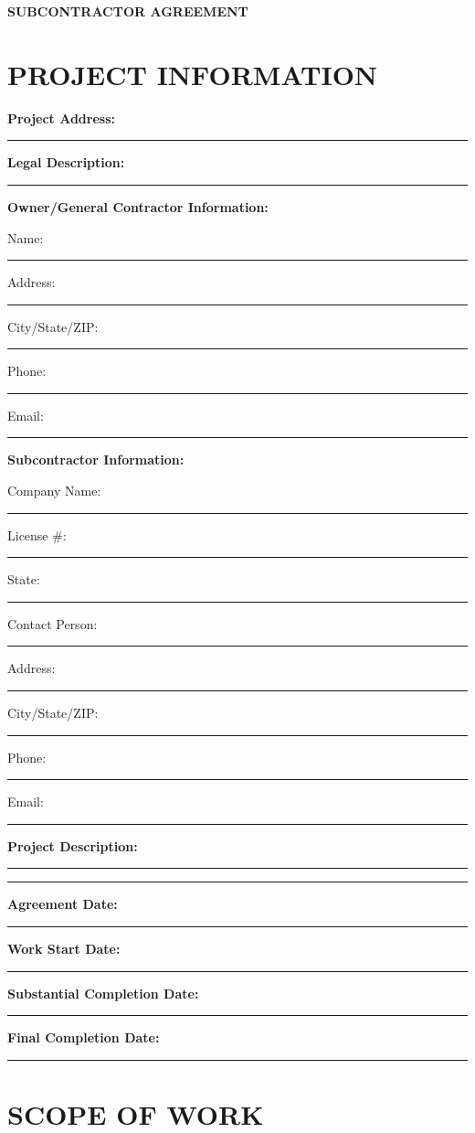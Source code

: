 \documentclass[11pt,letterpaper]{article}
\begin{document}
\begin{center}
\textbf{\Large SUBCONTRACTOR AGREEMENT}
\end{center}

\vspace{12pt}

\section*{PROJECT INFORMATION}

\textbf{Project Address:} \rule{10cm}{0.4pt}

\textbf{Legal Description:} \rule{9.5cm}{0.4pt}

\vspace{6pt}

\textbf{Owner/General Contractor Information:}

Name: \rule{12cm}{0.4pt}

Address: \rule{11.5cm}{0.4pt}

City/State/ZIP: \rule{10cm}{0.4pt}

Phone: \rule{5cm}{0.4pt} Email: \rule{6cm}{0.4pt}

\vspace{6pt}

\textbf{Subcontractor Information:}

Company Name: \rule{10cm}{0.4pt}

License \#: \rule{5cm}{0.4pt} State: \rule{3cm}{0.4pt}

Contact Person: \rule{9cm}{0.4pt}

Address: \rule{11.5cm}{0.4pt}

City/State/ZIP: \rule{10cm}{0.4pt}

Phone: \rule{5cm}{0.4pt} Email: \rule{6cm}{0.4pt}

\vspace{6pt}

\textbf{Project Description:} \rule{9cm}{0.4pt}

\rule{14cm}{0.4pt}

\textbf{Agreement Date:} \rule{4cm}{0.4pt}

\textbf{Work Start Date:} \rule{4cm}{0.4pt}

\textbf{Substantial Completion Date:} \rule{4cm}{0.4pt}

\textbf{Final Completion Date:} \rule{4cm}{0.4pt}

\newpage

\section*{SCOPE OF WORK}
\end{document}
